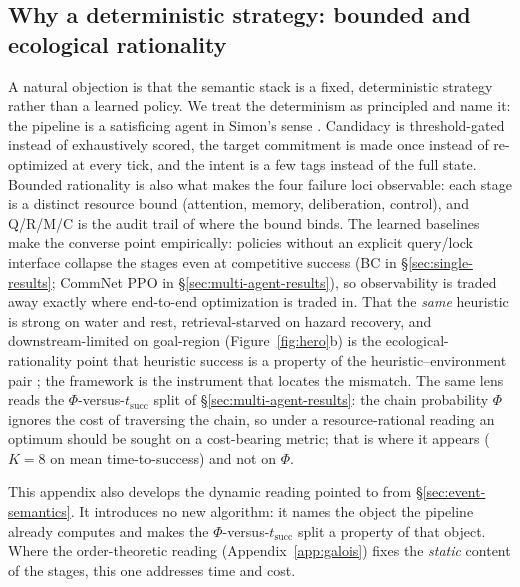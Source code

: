 \documentclass{article}
\begin{document}
\subsection*{Why a deterministic strategy: bounded and ecological rationality}
A natural objection is that the semantic stack is a fixed, deterministic strategy rather than a learned policy. We treat the determinism as principled and name it: the pipeline is a satisficing agent in Simon's sense \citep{simon1955behavioral,simon1956rational}. Candidacy is threshold-gated instead of exhaustively scored, the target commitment is made once instead of re-optimized at every tick, and the intent is a few tags instead of the full state. Bounded rationality is also what makes the four failure loci observable: each stage is a distinct resource bound (attention, memory, deliberation, control), and Q/R/M/C is the audit trail of where the bound binds. The learned baselines make the converse point empirically: policies without an explicit query/lock interface collapse the stages even at competitive success (BC in \S\ref{sec:single-results}; CommNet PPO in \S\ref{sec:multi-agent-results}), so observability is traded away exactly where end-to-end optimization is traded in. That the \emph{same} heuristic is strong on water and rest, retrieval-starved on hazard recovery, and downstream-limited on goal-region (Figure~\ref{fig:hero}b) is the ecological-rationality point that heuristic success is a property of the heuristic--environment pair \citep{simon1956rational,gigerenzer1996reasoning}; the framework is the instrument that locates the mismatch. The same lens reads the $\Phi$-versus-$t_{\mathrm{succ}}$ split of \S\ref{sec:multi-agent-results}: the chain probability $\Phi$ ignores the cost of traversing the chain, so under a resource-rational reading \citep{lieder2020resource} an optimum should be sought on a cost-bearing metric; that is where it appears ($K{=}8$ on mean time-to-success) and not on $\Phi$.

This appendix also develops the dynamic reading pointed to from
\S\ref{sec:event-semantics}. It introduces no new algorithm: it names the
object the pipeline already computes and makes the
$\Phi$-versus-$t_{\mathrm{succ}}$ split a property of that object. Where the
order-theoretic reading (Appendix~\ref{app:galois}) fixes the \emph{static}
content of the stages, this one addresses time and cost.
\end{document}
